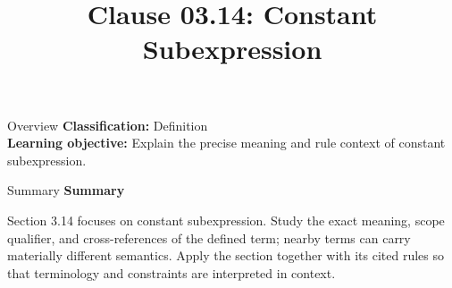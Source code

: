 \documentclass[10pt,letterpaper]{article}
\title{Clause 03.14: Constant Subexpression}
\author{}
\date{}
\begin{document}
\maketitle
\begin{CornellOverviewBox}{Overview}
\textbf{Classification:} Definition\\[2pt]
\textbf{Learning objective:} Explain the precise meaning and rule context of constant subexpression.
\end{CornellOverviewBox}\begin{CornellSummaryBox}{Summary}
{\sffamily\bfseries\color{Accent} Summary}\par\vspace{3pt}Section 3.14 focuses on constant subexpression. Study the exact meaning, scope qualifier, and cross-references of the defined term; nearby terms can carry materially different semantics. Apply the section together with its cited rules so that terminology and constraints are interpreted in context.
\end{CornellSummaryBox}
\end{document}
